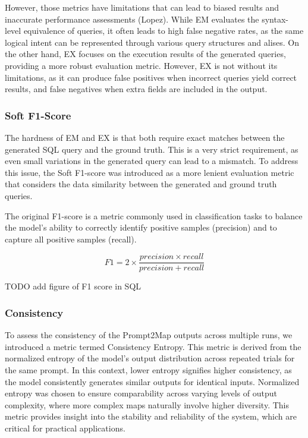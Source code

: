 However, those metrics have limitations that can lead to biased results and inaccurate performance assessments (Lopez). While EM evaluates the syntax-level equivalence of queries, it often leads to high false negative rates, as the same logical intent can be represented through various query structures and alises. On the other hand, EX focuses on the execution results of the generated queries, providing a more robust evaluation metric. However, EX is not without its limitations, as it can produce false positives when incorrect queries yield correct results, and false negatives when extra fields are included in the output.

\subsubsection{Soft F1-Score}

The hardness of EM and EX is that both require exact matches between the generated SQL query and the ground truth. This is a very strict requirement, as even small variations in the generated query can lead to a mismatch. To address this issue, the Soft F1-score was introduced as a more lenient evaluation metric that considers the data similarity between the generated and ground truth queries. 

The original F1-score is a metric commonly used in classification tasks to balance the model's ability to correctly identify positive samples (precision) and to capture all positive samples (recall).

\begin{equation}
    F1 = 2 \times \frac{precision \times recall}{precision + recall}
\end{equation}

TODO add figure of F1 score in SQL



\subsubsection{Consistency}

To assess the consistency of the Prompt2Map outputs across multiple runs, we introduced a metric termed Consistency Entropy. This metric is derived from the normalized entropy of the model's output distribution across repeated trials for the same prompt. In this context, lower entropy signifies higher consistency, as the model consistently generates similar outputs for identical inputs. Normalized entropy was chosen to ensure comparability across varying levels of output complexity, where more complex maps naturally involve higher diversity. This metric provides insight into the stability and reliability of the system, which are critical for practical applications.

